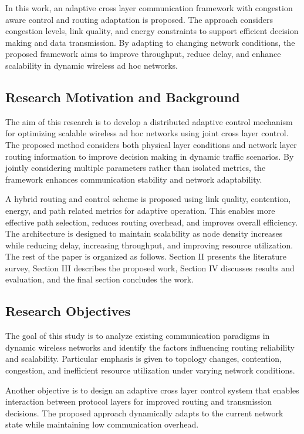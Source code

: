 \documentclass[a4paper,fleqn,final,1p]{cas-dc}
\numberwithin{equation}{section}
\begin{document}
In this work, an adaptive cross layer communication framework with congestion aware control and routing adaptation is proposed. The approach considers congestion levels, link quality, and energy constraints to support efficient decision making and data transmission. By adapting to changing network conditions, the proposed framework aims to improve throughput, reduce delay, and enhance scalability in dynamic wireless ad hoc networks.

\subsection{Research Motivation and Background}

The aim of this research is to develop a distributed adaptive control mechanism for optimizing scalable wireless ad hoc networks using joint cross layer control. The proposed method considers both physical layer conditions and network layer routing information to improve decision making in dynamic traffic scenarios. By jointly considering multiple parameters rather than isolated metrics, the framework enhances communication stability and network adaptability.

A hybrid routing and control scheme is proposed using link quality, contention, energy, and path related metrics for adaptive operation. This enables more effective path selection, reduces routing overhead, and improves overall efficiency. The architecture is designed to maintain scalability as node density increases while reducing delay, increasing throughput, and improving resource utilization. The rest of the paper is organized as follows. Section II presents the literature survey, Section III describes the proposed work, Section IV discusses results and evaluation, and the final section concludes the work.

\subsection{Research Objectives}

The goal of this study is to analyze existing communication paradigms in dynamic wireless networks and identify the factors influencing routing reliability and scalability. Particular emphasis is given to topology changes, contention, congestion, and inefficient resource utilization under varying network conditions.

Another objective is to design an adaptive cross layer control system that enables interaction between protocol layers for improved routing and transmission decisions. The proposed approach dynamically adapts to the current network state while maintaining low communication overhead.
\end{document}
